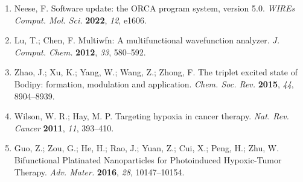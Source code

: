 \documentclass[12pt,a4paper]{article}
\begin{document}
\begin{enumerate}
  \item Neese, F. Software update: the ORCA program system, version 5.0. \textit{WIREs Comput. Mol. Sci.} \textbf{2022}, \textit{12}, e1606.

  \item Lu, T.; Chen, F. Multiwfn: A multifunctional wavefunction analyzer. \textit{J. Comput. Chem.} \textbf{2012}, \textit{33}, 580--592.

  \item Zhao, J.; Xu, K.; Yang, W.; Wang, Z.; Zhong, F. The triplet excited state of Bodipy: formation, modulation and application. \textit{Chem. Soc. Rev.} \textbf{2015}, \textit{44}, 8904--8939.

  \item Wilson, W. R.; Hay, M. P. Targeting hypoxia in cancer therapy. \textit{Nat. Rev. Cancer} \textbf{2011}, \textit{11}, 393--410.

  \item Guo, Z.; Zou, G.; He, H.; Rao, J.; Yuan, Z.; Cui, X.; Peng, H.; Zhu, W. Bifunctional Platinated Nanoparticles for Photoinduced Hypoxic-Tumor Therapy. \textit{Adv. Mater.} \textbf{2016}, \textit{28}, 10147--10154.
\end{enumerate}
\end{document}
